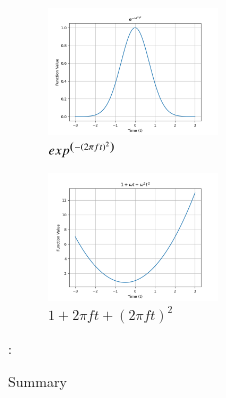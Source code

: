 \documentclass[journal,12pt,twocolumn]{IEEEtran}
\theoremstyle{remark}
\begin{document}
\begin{figure}[h!]
    \centering
    \includegraphics[width=0.4\textwidth]{figs/a1_fig5.png}
    \caption{$exp^{\left(-(2\pi ft)^2\right)}$}
\end{figure}
\begin{figure}[h!]
    \centering
    \includegraphics[width=0.4\textwidth]{figs/a1_fig6.png}
    \caption{$1+2\pi f t+(2\pi f t)^2$}
\end{figure}
\newpage
\begin{flushleft}
  \begin{table}[h]
   \def\arraystretch{1.5}:
   \caption{Summary}
   \label{tab:table.11.14-4}
   
  \end{table}
 \end{flushleft}
\end{document}

